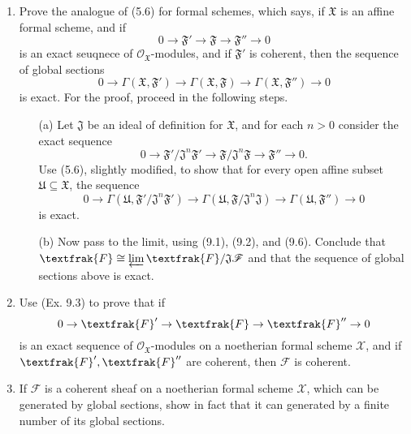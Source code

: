 \documentclass[12pt]{article}
\newcommand{\goth}[1]{\textfrak{#1}}
\newcommand{\fF}{\mathscr{F}}
\newcommand{\gF}{\goth{F}}
\newcommand{\OO}{\mathscr{O}}
\begin{document}
\begin{enumerate} [label=\textbf{\arabic*.}, leftmargin=0em]
\item Prove the analogue of (5.6) for formal schemes, which says, if $\mathfrak{X}$ is an affine formal scheme, and if
\begin{equation*}
    0 \to \mathfrak{F}' \to \mathfrak{F} \to \mathfrak{F}'' \to 0
\end{equation*}
is an exact seuqnece of $\OO_\mathfrak{X}$-modules, and if $\mathfrak{F}'$ is coherent, then the sequence of global sections
\begin{equation*}
    0 \to \Gamma(\mathfrak{X}, \mathfrak{F}') \to \Gamma(\mathfrak{X}, \mathfrak{F}) \to \Gamma(\mathfrak{X}, \mathfrak{F}'') \to 0
\end{equation*}
is exact. For the proof, proceed in the following steps.
\begin{itemize}
    \item[(a)] Let $\mathfrak{J}$ be an ideal of definition for $\mathfrak{X}$, and for each $n > 0$ consider the exact sequence
    \begin{equation*}
        0 \to \mathfrak{F}'/\mathfrak{J}^n \mathfrak{F}' \to \mathfrak{F} / \mathfrak{J}^n \mathfrak{F} \to \mathfrak{F}'' \to 0.
    \end{equation*}
    Use (5.6), slightly modified, to show that for every open affine subset $\mathfrak{U} \subseteq \mathfrak{X}$, the sequence
    \begin{equation*}
        0 \to \Gamma(\mathfrak{U}, \mathfrak{F}'/\mathfrak{J}^n \mathfrak{F}') \to \Gamma(\mathfrak{U}, \mathfrak{F}/\mathfrak{J}^n \mathfrak{J}) \to \Gamma(\mathfrak{U}, \mathfrak{F}'') \to 0
    \end{equation*}
    is exact.
    \item[(b)] Now pass to the limit, using (9.1), (9.2), and (9.6). Conclude that $\gF \cong \varprojlim \gF / \mathfrak{J} \fF$ and that the sequence of global sections above is exact.
\end{itemize}

\item Use (Ex. 9.3) to prove that if
\begin{equation*}
    0 \to \gF' \to \gF \to \gF'' \to 0
\end{equation*}
is an exact sequence of $\OO_\mathfrak{X}$-modules on a noetherian formal scheme $\mathscr{X}$, and if $\gF', \gF''$ are coherent, then $\fF$ is coherent.

\item If $\fF$ is a coherent sheaf on a noetherian formal scheme $\mathscr{X}$, which can be generated by global sections, show in fact that it can generated by a finite number of its global sections.


\end{enumerate}
\end{document}
